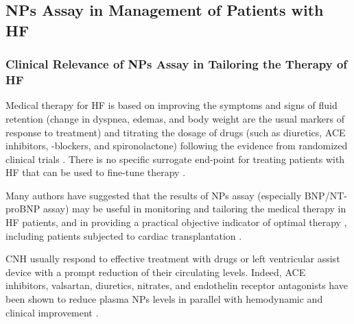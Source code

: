 \documentclass[14pt,a4paper,onecolumn]{extarticle}
\begin{document}





\subsection{ NPs Assay in Management of Patients with HF}





\subsubsection{ Clinical Relevance of NPs Assay in Tailoring the Therapy of HF}



Medical therapy for HF is based on improving the symptoms and signs of fluid retention (change in dyspnea, edemas, and body weight are the usual markers of response to treatment) and titrating the dosage of drugs (such as diuretics, ACE inhibitors, \beta-blockers, and spironolactone) following the evidence from randomized clinical trials \citep{bib365} \citep{bib368} \citep{bib369} \citep{bib370}. There is no specific surrogate end-point for treating patients with HF that can be used to fine-tune therapy \citep{bib365} \citep{bib368} \citep{bib369} \citep{bib370}.



Many authors have suggested that the results of NPs assay (especially BNP/NT-proBNP assay) may be useful in monitoring and tailoring the medical therapy in HF patients, and in providing a practical objective indicator of optimal therapy \citep{bib361} \citep{bib362} \citep{bib363} \citep{bib364} \citep{bib365} \citep{bib368} \citep{bib369} \citep{bib370} \citep{bib385} \citep{bib390} \citep{bib3168} \citep{bib3252} \citep{Troughton2000} \citep{bib3286} \citep{bib3255} \citep{bib3256} \citep{bib3257} \citep{bib3258} \citep{bib3259} \citep{bib3260} \citep{bib3261} \citep{bib3262} \citep{bib3263} \citep{bib3264}  \citep{Mueller2004}, including patients subjected to cardiac transplantation \citep{bib3266}.



CNH usually respond to effective treatment with drugs \citep{bib35} \citep{bib361} \citep{bib362} \citep{bib363} \citep{bib364} \citep{bib365} or left ventricular assist device \citep{bib3267} \citep{bib3268} with a prompt reduction of their circulating levels. Indeed, ACE inhibitors, valsartan, diuretics, nitrates, and endothelin receptor antagonists have been shown to reduce plasma NPs levels in parallel with hemodynamic and clinical improvement \citep{bib362} \citep{bib363} \citep{bib3252} \citep{bib3258} \citep{bib3271} \citep{bib3272} \citep{bib3273} \citep{bib3284} \citep{bib3275} \citep{bib3276} \citep{bib3277}.
\end{document}
